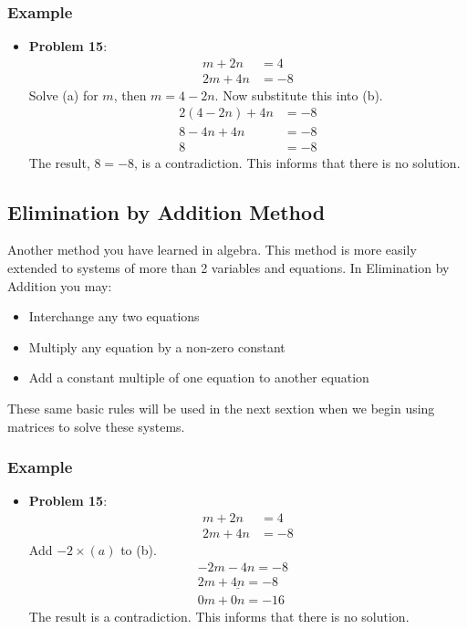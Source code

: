 \documentclass[14pt]{extarticle}
\begin{document}
\subsubsection*{Example}
\begin{itemize}
	\item \textbf{Problem 15}:
	\begin{align*}
		m+2n &= 4 \tag{a}\\
		2m + 4n &= -8 \tag{b}
	\end{align*}
	Solve (a) for $m$, then $m= 4- 2n$. Now substitute this into (b).
	\begin{align*}
		2(4- 2n) + 4n &= -8 \\
		8-4n +4n &= -8 \\
		8 &= -8
	\end{align*}
	The result, $8=-8$, is a contradiction. This informs that there is no solution.
\end{itemize}

\subsection*{Elimination by Addition Method}
Another method you have learned in algebra. This method is more easily extended to systems of more than 2 variables and equations. In Elimination by Addition you may:
\begin{itemize}
	\item Interchange any two equations
	\item Multiply any equation by a non-zero constant
	\item Add a constant multiple of one equation to another equation
\end{itemize}
These same basic rules will be used in the next sextion when we begin using matrices to solve these systems.

\subsubsection*{Example}
\begin{itemize}
	\item \textbf{Problem 15}:
	\begin{align*}
		m+2n &= 4 \tag{a}\\
		2m + 4n &= -8 \tag{b}
	\end{align*}
	Add $-2 \times (a)$ to (b).
	\begin{align*}
		-2m -4n = -8& \\
		\underline{2m + 4n = -8}& \\
		0m+0n = -16&
	\end{align*}
	The result is a contradiction. This informs that there is no solution.
\end{itemize}
\end{document}
